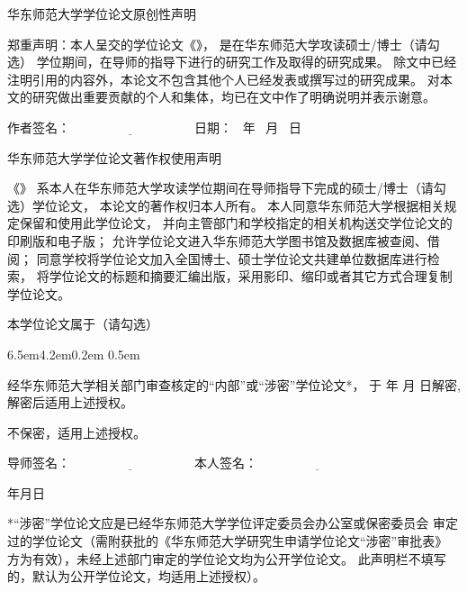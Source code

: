 \newpage
\thispagestyle{empty}

\vspace*{1em}

{
\linespread{1.4}
\centerline{\STSong 华东师范大学学位论文原创性声明}

\bigskip

郑重声明：本人呈交的学位论文《\cctitle》，
是在华东师范大学攻读硕士/博士（请勾选）
学位期间，在导师的指导下进行的研究工作及取得的研究成果。
除文中已经注明引用的内容外，本论文不包含其他个人已经发表或撰写过的研究成果。
对本文的研究做出重要贡献的个人和集体，均已在文中作了明确说明并表示谢意。

\vspace{1em}


{\STSong 作者签名}：$\underline{\hspace{4cm}}$ \hfill
{\STSong 日\quad 期}： \qquad\ 年 \quad\ 月 \quad\ 日 \qquad\mbox{}

\vspace{4em}

\centerline{\STSong 华东师范大学学位论文著作权使用声明}
\bigskip


《\cctitle》
系本人在华东师范大学攻读学位期间在导师指导下完成的硕士/博士（请勾选）学位论文，
本论文的著作权归本人所有。
本人同意华东师范大学根据相关规定保留和使用此学位论文，
并向主管部门和学校指定的相关机构送交学位论文的印刷版和电子版；
允许学位论文进入华东师范大学图书馆及数据库被查阅、借阅；
同意学校将学位论文加入全国博士、硕士学位论文共建单位数据库进行检索，
将学位论文的标题和摘要汇编出版，采用影印、缩印或者其它方式合理复制学位论文。

本学位论文属于（请勾选）
\begin{list}{{\hfill\upshape (\qquad)\ . }}{%
     \leftmargin6.5em4.2em0.2em
     \itemsep0.5em}

\item 经华东师范大学相关部门审查核定的“内部”或“涉密”学位论文*，
  于 \qquad 年 \quad 月 \quad  日解密, 解密后适用上述授权。

\item 不保密，适用上述授权。
\end{list}

\vskip0.8cm


{\STSong 导师签名}：$\underline{\hspace{4cm}}$ \hfill
{\STSong 本人签名}：$\underline{\hspace{4cm}}$

\bigskip

{\mbox{}\hfill 年\qquad 月\qquad  日 }

\vfill

\parbox[t]{0.946\textwidth}{
*“涉密”学位论文应是已经华东师范大学学位评定委员会办公室或保密委员会
审定过的学位论文（需附获批的《华东师范大学研究生申请学位论文“涉密”审批表》
方为有效），未经上述部门审定的学位论文均为公开学位论文。
此声明栏不填写的，默认为公开学位论文，均适用上述授权）。\\
}}
